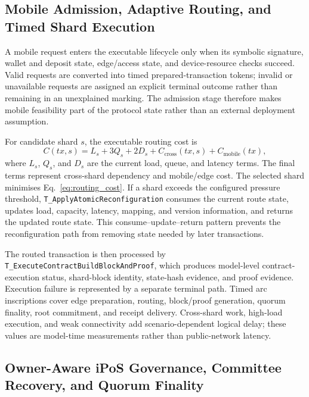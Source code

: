 \documentclass[a4paper,fleqn]{cas-sc}
\begin{document}
\subsection{Mobile Admission, Adaptive Routing, and Timed Shard Execution}
\label{subsec:routing_semantics}

A mobile request enters the executable lifecycle only when its symbolic
signature, wallet and deposit state, edge/access state, and device-resource
checks succeed. Valid requests are converted into timed prepared-transaction
tokens; invalid or unavailable requests are assigned an explicit terminal
outcome rather than remaining in an unexplained marking. The admission stage
therefore makes mobile feasibility part of the protocol state rather than an
external deployment assumption.

For candidate shard \(s\), the executable routing cost is
\begin{equation}
C(tx,s)=L_s+3Q_s+2D_s+C_{\mathrm{cross}}(tx,s)+C_{\mathrm{mobile}}(tx),
\label{eq:routing_cost}
\end{equation}
where \(L_s\), \(Q_s\), and \(D_s\) are the current load, queue, and latency
terms. The final terms represent cross-shard dependency and mobile/edge cost.
The selected shard minimises Eq.~\eqref{eq:routing_cost}. If a shard exceeds
the configured pressure threshold,
\texttt{T\_ApplyAtomicReconfiguration} consumes the current route state,
updates load, capacity, latency, mapping, and version information, and returns
the updated route state. This consume--update--return pattern prevents the
reconfiguration path from removing state needed by later transactions.

The routed transaction is then processed by
\texttt{T\_ExecuteContractBuildBlockAndProof}, which produces model-level
contract-execution status, shard-block identity, state-hash evidence, and proof
evidence. Execution failure is represented by a separate terminal path. Timed
arc inscriptions cover edge preparation, routing, block/proof generation,
quorum finality, root commitment, and receipt delivery. Cross-shard work,
high-load execution, and weak connectivity add scenario-dependent logical
delay; these values are model-time measurements rather than public-network
latency.

\subsection{Owner-Aware iPoS Governance, Committee Recovery, and Quorum Finality}
\label{subsec:validator_committee}
\end{document}
